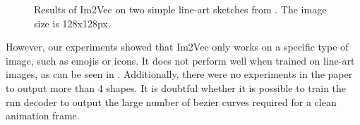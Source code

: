 \begin{figure}
    \centering
    \caption{Results of Im2Vec \citep{DBLP:conf/cvpr/Reddy21} on two simple line-art sketches from \citet{eitz2012hdhso}. The image size is 128x128px.}
    \label{fig:im2vec.simpletest}
\end{figure}

However, our experiments showed that Im2Vec only works on a specific type of image, such as emojis or icons. It does not perform well when trained on line-art images, as can be seen in . Additionally, there were no experiments in the paper to output more than 4 shapes. It is doubtful whether it is possible to train the \gls{rnn} decoder to output the large number of bezier curves required for a clean animation frame.

